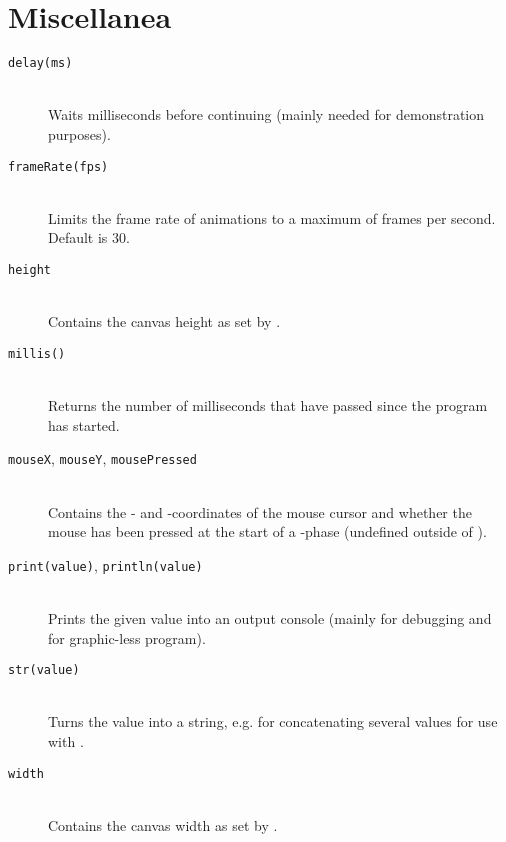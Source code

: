 \section{Miscellanea}
\begin{description}
\item[\texttt{delay(ms)}] \hfill \\
	Waits  milliseconds before continuing (mainly needed for demonstration purposes).
\item[\texttt{frameRate(fps)}] \hfill \\
	Limits the frame rate of animations to a maximum of  frames per second. Default is 30.
\item[\texttt{height}] \hfill \\
	Contains the canvas height as set by .
\item[\texttt{millis()}] \hfill \\
	Returns the number of milliseconds that have passed since the program has started.
\item[\texttt{mouseX}, \texttt{mouseY}, \texttt{mousePressed}] \hfill \\
	Contains the - and -coordinates of the mouse cursor and whether the mouse has been pressed at the start of a -phase (undefined outside of ).
\item[\texttt{print(value)}, \texttt{println(value)}] \hfill \\
	Prints the given value into an output console (mainly for debugging and for graphic-less program).
\item[\texttt{str(value)}] \hfill \\
	Turns the value into a string, e.g. for concatenating several values for use with .
\item[\texttt{width}] \hfill \\
	Contains the canvas width as set by .
\end{description}
